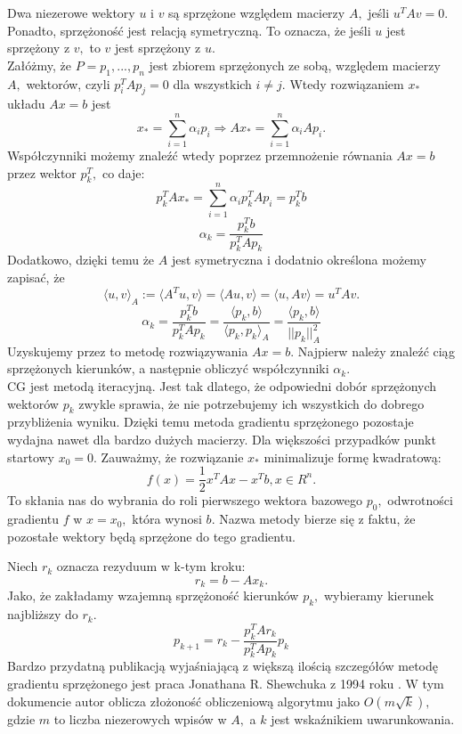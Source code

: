\documentclass[a4paper,12pt]{book} %
\begin{document}
Dwa niezerowe wektory $u$ i $v$ są sprzężone względem macierzy $A,$ jeśli $u^TAv=0.$ Ponadto, sprzężoność jest relacją symetryczną. To oznacza, że jeśli $u$ jest sprzężony z $v,$ to $v$ jest sprzężony z $u$.
\\
Załóżmy, że $P = {p_1,...,p_n}$ jest zbiorem sprzężonych ze sobą, względem macierzy $A,$ wektorów, czyli $p_i^TAp_j = 0$ dla wszystkich $i \neq j$. Wtedy rozwiązaniem $x_\ast$ układu $Ax=b$ jest 
$$ x_\ast = \sum_{i=1}^n\alpha_ip_i \Rightarrow Ax_\ast = \sum_{i=1}^n\alpha_iAp_i. $$
Współczynniki możemy znaleźć wtedy poprzez przemnożenie równania $Ax=b$ przez wektor $p_k^T,$ co daje:
$$ p_k^TAx_\ast = \sum_{i=1}^n\alpha_ip_k^TAp_i = p_k^Tb $$
$$ \alpha_k = \frac{p_k^Tb}{p_k^TAp_k} $$
Dodatkowo, dzięki temu że $A$ jest symetryczna i dodatnio określona możemy zapisać, że
$$\langle u, v\rangle_A := \langle A^Tu, v\rangle = \langle Au, v\rangle = \langle u,Av\rangle = u^TAv.$$
$$ \alpha_k = \frac{p_k^Tb}{p_k^TAp_k} = \frac{\langle p_k, b \rangle}{\langle p_k, p_k\rangle _A} = \frac{\langle p_k, b\rangle}{||p_k||_A^2}$$
Uzyskujemy przez to metodę rozwiązywania $Ax = b.$ Najpierw należy znaleźć ciąg sprzężonych kierunków, a następnie obliczyć współczynniki $\alpha_k.$
\\

CG jest metodą iteracyjną. Jest tak dlatego, że odpowiedni dobór sprzężonych wektorów $p_k$ zwykle sprawia, że nie potrzebujemy ich wszystkich do dobrego przybliżenia wyniku. Dzięki temu metoda gradientu sprzężonego pozostaje wydajna nawet dla bardzo dużych macierzy.
Dla większości przypadków punkt startowy $x_0 = 0$. Zauważmy, że rozwiązanie $x_\ast$ minimalizuje formę kwadratową:
$$ f(x) = \frac{1}{2}x^TAx-x^Tb, x\in R^n.$$
To skłania nas do wybrania do roli pierwszego wektora bazowego $p_0,$ odwrotności gradientu $f$ w $x = x_0,$ która wynosi $b.$ Nazwa metody bierze się z faktu, że pozostałe wektory będą sprzężone do tego gradientu.

Niech $r_k$ oznacza rezyduum w k-tym kroku:
$$r_k = b-Ax_k.$$ Jako, że zakładamy wzajemną sprzężoność kierunków $p_k,$ wybieramy kierunek najbliższy do $r_k.$\cite{cg_wiki}
$$p_{k+1} = r_k - \frac{p_k^TAr_k}{p_k^TAp_k}p_k$$
Bardzo przydatną publikacją wyjaśniającą z większą ilością szczegółów metodę gradientu sprzężonego jest praca Jonathana R. Shewchuka z 1994 roku \cite{cg_without_pain}. W tym dokumencie autor oblicza złożoność obliczeniową algorytmu jako $O(m\sqrt{k}),$ gdzie $m$ to liczba niezerowych wpisów w $A,$ a $k$ jest wskaźnikiem uwarunkowania.
\end{document}
